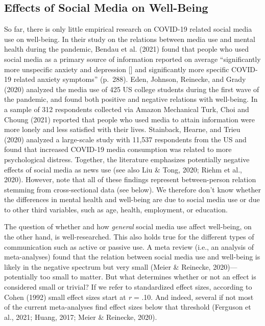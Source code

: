 \documentclass[
  english,
  man,mask,floatsintext]{apa6}
\begin{document}
\hypertarget{effects-of-social-media-on-well-being}{%
\subsection{Effects of Social Media on Well-Being}\label{effects-of-social-media-on-well-being}}

So far, there is only little empirical research on COVID-19 related social media use on well-being.
In their study on the relations between media use and mental health during the pandemic, Bendau et al. (2021) found that people who used social media as a primary source of information reported on average ``significantly more unspecific anxiety and depression {[}{]} and significantly more specific COVID-19 related anxiety symptoms'' (p.~288).
Eden, Johnson, Reinecke, and Grady (2020) analyzed the media use of 425 US college students during the first wave of the pandemic, and found both positive and negative relations with well-being.
In a sample of 312 respondents collected via Amazon Mechanical Turk, Choi and Choung (2021) reported that people who used media to attain information were more lonely and less satisfied with their lives.
Stainback, Hearne, and Trieu (2020) analyzed a large-scale study with 11,537 respondents from the US and found that increased COVID-19 media consumption was related to more psychological distress.
Together, the literature emphasizes potentially negative effects of social media as news use (see also Liu \& Tong, 2020; Riehm et al., 2020).
However, note that all of these findings represent between-person relation stemming from cross-sectional data (see below).
We therefore don't know whether the differences in mental health and well-being are due to social media use or due to other third variables, such as age, health, employment, or education.

The question of whether and how \emph{general} social media use affect well-being, on the other hand, is well-researched.
This also holds true for the different types of communication such as active or passive use.
A meta review (i.e., an analysis of meta-analyses) found that the relation between social media use and well-being is likely in the negative spectrum but very small (Meier \& Reinecke, 2020)---potentially too small to matter.
But what determines whether or not an effect is considered small or trivial?
If we refer to standardized effect sizes, according to Cohen (1992) small effect sizes start at \emph{r} = .10.
And indeed, several if not most of the current meta-analyses find effect sizes below that threshold (Ferguson et al., 2021; Huang, 2017; Meier \& Reinecke, 2020).
\end{document}
